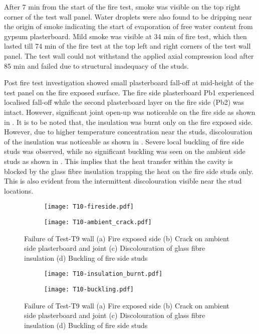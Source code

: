 After 7 min from the start of the fire test, smoke was visible on the top right corner of the test wall panel. Water droplets were also found to be dripping near the origin of smoke indicating the start of evaporation of free water content from gypsum plasterboard. Mild smoke was visible at 34 min of fire test, which then lasted till 74 min of the fire test at the top left and right corners of the test wall panel. The test wall could not withstand the applied axial compression load after 85 min and failed due to structural inadequacy of the studs. 

Post fire test investigation showed small plasterboard fall-off at mid-height of the test panel on the fire exposed surface. The fire side plasterboard Pb1 experienced localised fall-off while the second plasterboard layer on the fire side (Pb2) was intact. However, significant joint open-up was noticeable on the fire side as shown in . It is to be noted that, the insulation was burnt only on the fire exposed side. However, due to higher temperature concentration near the studs, discolouration of the insulation was noticeable as shown in . Severe local buckling of fire side studs was observed, while no significant buckling was seen on the ambient side studs as shown in . This implies that the heat transfer within the cavity is blocked by the glass fibre insulation trapping the heat on the fire side studs only. This is also evident from the intermittent discolouration visible near the stud locations. 
\begin{figure}[!htbp]
	\centering
	\begin{subfigure}[b]{0.4\textwidth}
		\centering
		\texttt{[image: T10-fireside.pdf]}
		\caption{}
		\label{subfig:T10-fireside}
	\end{subfigure}
	\begin{subfigure}[b]{0.4\textwidth}
		\centering
		\texttt{[image: T10-ambient\_crack.pdf]}
		\caption{}
		\label{subfig:T10-ambient_crack}
	\end{subfigure}
	\caption{Failure of Test-T9 wall (a) Fire exposed side (b) Crack on ambient side plasterboard and joint (c) Discolouration of glass fibre insulation (d) Buckling of fire side studs}
	   \label{fig:T10-failure-a}
\end{figure}
\begin{figure}[!htbp]
	\ContinuedFloat
	\centering
	\begin{subfigure}[b]{0.8\textwidth}
		\centering
		\texttt{[image: T10-insulation\_burnt.pdf]}
		\caption{}
		\label{subfig:T10-insulation_burnt}
	\end{subfigure}
	\begin{subfigure}[b]{0.8\textwidth}
		\centering
		\texttt{[image: T10-buckling.pdf]}
		\caption{}
		\label{subfig:T10-buckling}
	\end{subfigure}
	   \caption{Failure of Test-T9 wall (a) Fire exposed side (b) Crack on ambient side plasterboard and joint (c) Discolouration of glass fibre insulation (d) Buckling of fire side studs}
	   \label{fig:T10-failure-b}
\end{figure}

